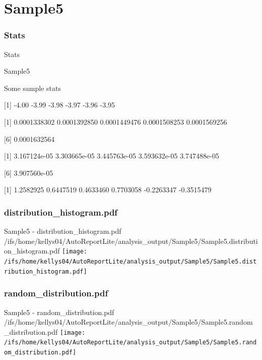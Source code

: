 \documentclass[8pt]{beamer}\usepackage[]{graphicx}\usepackage[]{color}
\begin{document}
\section{Sample5}
\subsubsection{Stats}
\begin{frame}{Stats }
\small{
Sample5 

Some sample stats

[1] -4.00 -3.99 -3.98 -3.97 -3.96 -3.95

[1] 0.0001338302 0.0001392850 0.0001449476 0.0001508253 0.0001569256

[6] 0.0001632564

[1] 3.167124e-05 3.303665e-05 3.445763e-05 3.593632e-05 3.747488e-05

[6] 3.907560e-05

[1]  1.2582925  0.6447519  0.4633460  0.7703058 -0.2263347 -0.3515479
}

\end{frame}

\subsubsection{distribution\_histogram.pdf}
\begin{frame}{Sample5 - distribution\_histogram.pdf }
\scriptsize{/ifs/home/kellys04/AutoReportLite/analysis\_output/Sample5/Sample5.distribution\_histogram.pdf}
\texttt{[image: /ifs/home/kellys04/AutoReportLite/analysis\_output/Sample5/Sample5.distribution\_histogram.pdf]}
\end{frame}

\subsubsection{random\_distribution.pdf}
\begin{frame}{Sample5 - random\_distribution.pdf }
\scriptsize{/ifs/home/kellys04/AutoReportLite/analysis\_output/Sample5/Sample5.random\_distribution.pdf}
\texttt{[image: /ifs/home/kellys04/AutoReportLite/analysis\_output/Sample5/Sample5.random\_distribution.pdf]}
\end{frame}



\end{document}
